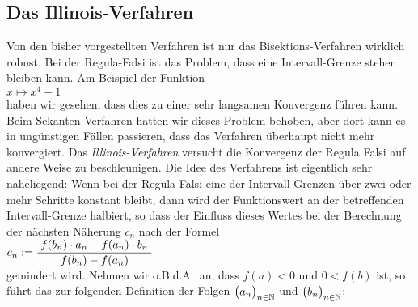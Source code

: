 \subsection{Das Illinois-Verfahren}
Von den bisher vorgestellten Verfahren ist nur das Bisektions-Verfahren wirklich robust.
Bei der Regula-Falsi ist das Problem, dass eine Intervall-Grenze stehen bleiben kann. Am
Beispiel der Funktion
\\[0.2cm]
\hspace*{1.3cm}
 $x \mapsto x^4 - 1$ 
\\[0.2cm]
haben wir gesehen, dass dies zu einer sehr
langsamen Konvergenz f\"uhren kann.  Beim Sekanten-Verfahren hatten wir dieses Problem
behoben, aber dort kann es in ung\"unstigen F\"allen passieren, dass das Verfahren \"uberhaupt nicht mehr
konvergiert.  Das \emph{Illinois-Verfahren} \cite{dowell:1971} versucht die Konvergenz der Regula Falsi
auf andere Weise zu beschleunigen.  Die Idee des Verfahrens ist eigentlich sehr naheliegend:
Wenn bei der Regula Falsi eine der Intervall-Grenzen \"uber zwei oder mehr Schritte konstant bleibt,
dann wird der Funktionswert an der betreffenden Intervall-Grenze halbiert, so dass der Einfluss dieses
Wertes bei der Berechnung der n\"achsten N\"aherung $c_n$ nach der Formel
\\[0.2cm]
\hspace*{1.3cm}
$c_n := \displaystyle\frac{\;\displaystyle f(b_n) \cdot a_n - f(a_n) \cdot b_n\;}{\;\displaystyle f(b_n) - f(a_n)\;}$
\\[0.2cm]
gemindert wird.  Nehmen wir o.B.d.A.~an, dass $f(a) < 0$ und $0 < f(b)$ ist, so f\"uhrt das zur folgenden 
Definition der Folgen $\bigl(a_n\bigr)_{n\in\mathbb{N}}$ und $\bigl(b_n\bigr)_{n\in\mathbb{N}}$:
